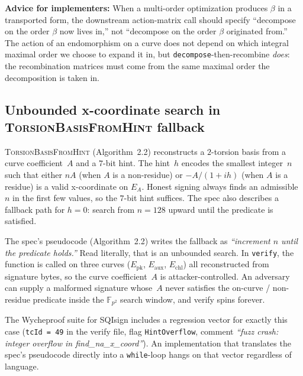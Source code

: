 \noindent
\textbf{Advice for implementers:}  When a multi-order
optimization produces $\beta$ in a transported form, the
downstream action-matrix call should specify ``decompose on
the order $\beta$ now lives in,'' not ``decompose on the
order $\beta$ originated from.''  The action of an
endomorphism on a curve does not depend on which integral
maximal order we choose to expand it in, but
\texttt{decompose}-then-recombine \emph{does}: the
recombination matrices must come from the same maximal order
the decomposition is taken in.

\subsection{Unbounded x-coordinate search in
  \textsc{TorsionBasisFromHint} fallback}
\label{sec:bug-find-na-x-coord-unbounded}

\textsc{TorsionBasisFromHint} (Algorithm~2.2) reconstructs a
$2$-torsion basis from a curve coefficient~$A$ and a $7$-bit
hint.  The hint~$h$ encodes the smallest integer~$n$ such that
either $n A$ (when $A$ is a non-residue) or $-A/(1 + i h)$
(when $A$ is a residue) is a valid x-coordinate on $E_A$.
Honest signing always finds an admissible~$n$ in the first few
values, so the $7$-bit hint suffices.  The spec also describes
a fallback path for $h = 0$: search from $n = 128$ upward
until the predicate is satisfied.

The spec's pseudocode (Algorithm~2.2) writes the fallback as
\textit{``increment $n$ until the predicate holds.''}  Read
literally, that is an unbounded search.  In \texttt{verify},
the function is called on three curves
($E_{\mathrm{pk}}$, $E_{\mathrm{aux}}$, $E_{\mathrm{chl}}$)
all reconstructed from signature bytes, so the curve
coefficient~$A$ is attacker-controlled.  An adversary can
supply a malformed signature whose~$A$ never satisfies the
on-curve / non-residue predicate inside the
$\mathbb{F}_{p^2}$ search window, and verify spins forever.

The Wycheproof suite for SQIsign includes a regression vector
for exactly this case (\texttt{tcId = 49} in the verify file,
flag \texttt{HintOverflow}, comment \textit{``fuzz crash:
integer overflow in find\_na\_x\_coord''}).  An implementation
that translates the spec's pseudocode directly into a
\texttt{while}-loop hangs on that vector regardless of
language.


